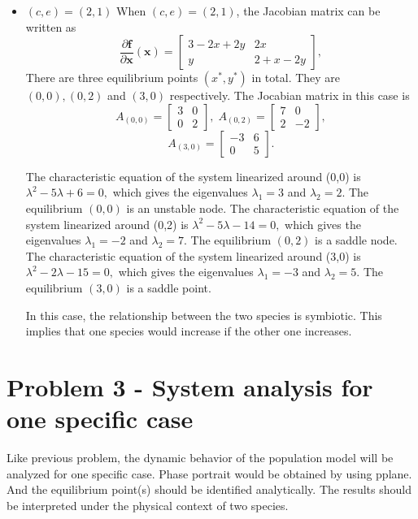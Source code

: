 \documentclass[a4paper,twocolumn]{article} %
\begin{document}
\begin{itemize}
\item $(c,e)=(2,1)$ 
When $(c,e)=(2,1)$, the Jacobian matrix can be written as
\begin{equation*}
    \frac{\partial\textbf{f}}{\partial \textbf{x}}(\textbf{x}) =
    \left[\begin{array}{cc}
    3-2x+2y & 2x \\
    y & 2+x-2y
    \end{array}\right],
\end{equation*}
There are three equilibrium points $(x^*,y^*)$ in total. They are $(0,0),(0,2)$ and $(3,0)$ respectively. The Jocabian matrix in this case is
\begin{equation*}
    A_{(0,0)} =
    \left[\begin{array}{cc}
    3 & 0 \\
    0 & 2
    \end{array}\right], \; A_{(0,2)} =
    \left[\begin{array}{cc}
    7 & 0 \\
    2 & -2
    \end{array}\right],   
    \end{equation*}
    \begin{equation*}
    A_{(3,0)} =
    \left[\begin{array}{cc}
    -3 & 6 \\
    0 & 5
    \end{array}\right].
\end{equation*}

The characteristic equation of the system linearized around \mbox{(0,0)} is
$\lambda^2 -5 \lambda + 6 = 0,$ which gives the eigenvalues $\lambda_{1} = 3$ and $\lambda_{2} = 2$. The equilibrium $(0,0)$ is an unstable node. 
The characteristic equation of the system linearized around \mbox{(0,2)} is
$\lambda^2 -5 \lambda - 14 = 0,$ which gives the eigenvalues $\lambda_1 = -2$ and $\lambda_2 = 7$. The equilibrium $(0,2)$ is a saddle node. 
The characteristic equation of the system linearized around \mbox{(3,0)} is
$\lambda^2 -2 \lambda - 15 = 0,$ which gives the eigenvalues $\lambda_1 = -3$ and $\lambda_2 = 5$. The equilibrium $(3,0)$ is a saddle point.

In this case, the relationship between the two species is symbiotic. This implies that one species would increase if the other one increases. 
\end{itemize}

\section*{Problem 3 - System analysis for one specific case}
\label{sec:prob3} 
Like previous problem, the dynamic behavior of the population model will be analyzed for one specific case. Phase portrait would be obtained by using pplane. And the equilibrium point(s) should be identified analytically. The results should be interpreted under the physical context of two species. 
\end{document}
